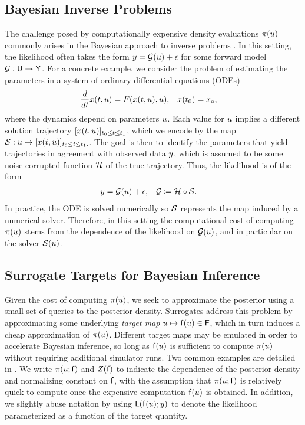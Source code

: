 \documentclass[12pt]{article}
\begin{document}
\subsection{Bayesian Inverse Problems} \label{sec:bip}
The challenge posed by computationally expensive density evaluations $\pi(u)$ commonly 
arises in the Bayesian approach to inverse problems \citep{Stuart_BIP}. In this setting, 
the likelihood often takes the form $y = \mathcal{G}(u) + \epsilon$ for some forward model
$\mathcal{G}: \mathsf{U} \to \mathsf{Y}$. For a concrete example, we consider the problem of estimating the 
parameters in a system of ordinary differential equations (ODEs)
\begin{align}
\frac{d}{dt} x(t, u) &= F(x(t, u), u), &&x(t_0) = x_{\circ}, \label{ode_ivp}
\end{align}
where the dynamics depend on parameters $u$. Each value for $u$ implies a different solution trajectory
$[x(t, u)]_{t_0 \leq t \leq t_1}$, which we encode by the
map $\mathcal{S}: u \mapsto [x(t, u)]_{t_0 \leq t \leq t_1.}$. The goal is then 
to identify the parameters that yield trajectories in agreement with observed data 
$y$, which is assumed to be some noise-corrupted function $\mathcal{H}$ of the true trajectory. Thus, the 
likelihood is of the form 
\begin{align}
&y = \mathcal{G}(u) + \epsilon, &&\mathcal{G} \coloneqq \mathcal{H} \circ \mathcal{S}. \label{eq:additive-noise}
\end{align}
In practice, the ODE is solved numerically so $\mathcal{S}$ represents the map induced by a numerical 
solver. Therefore, in this setting the computational cost of computing $\pi(u)$ stems from the 
dependence of the likelihood on $\mathcal{G}(u)$, and in particular on the solver $\mathcal{S}(u)$.

\subsection{Surrogate Targets for Bayesian Inference} \label{sec:surrogates-Bayes}
Given the cost of computing $\pi(u)$, we seek to approximate
the posterior using a small set of queries to the posterior density. 
Surrogates address this problem by approximating some underlying 
\textit{target map} $u \mapsto \mathsf{f}(u) \in \mathsf{F}$, which in turn 
induces a cheap approximation of $\pi(u)$.
Different target maps may be emulated in order to
accelerate Bayesian inference, so long as $\mathsf{f}(u)$ is sufficient 
to compute $\pi(u)$ without requiring additional simulator runs.
Two common examples are detailed in .
We write $\pi(u; \mathsf{f})$ and $Z(\mathsf{f})$ to indicate the 
dependence of the posterior density and normalizing constant on $\mathsf{f}$, 
with the assumption that $\pi(u; \mathsf{f})$ is relatively 
quick to compute once the expensive computation $\mathsf{f}(u)$ is
obtained. In addition, we slightly abuse notation by using $\mathsf{L}(\mathsf{f}(u); y)$ 
to denote the likelihood parameterized as a function of the target quantity. 
\end{document}
